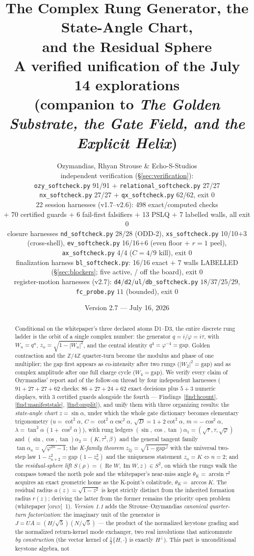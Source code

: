 \documentclass[11pt]{article}
\title{\bfseries The Complex Rung Generator, the State-Angle Chart,\\
and the Residual Sphere\\[4pt]
\large A verified unification of the July 14 explorations\\
(companion to \emph{The Golden Substrate, the Gate Field, and the Explicit Helix})}
\author{Ozymandias, Rhyan Strouse \& Echo-S-Studios\\[2pt]
\small independent verification (\S\ref{sec:verification}):\\
\small \texttt{ozy\_softcheck.py} 91/91 $+$ \texttt{relational\_softcheck.py} 27/27\\
\small \texttt{nx\_softcheck.py} 27/27 $+$ \texttt{qx\_softcheck.py} 62/62, exit 0\\
\small 22 session harnesses (v1.7--v2.6): 498 exact/computed checks\\
\small $+$ 70 certified guards $+$ 6 fail-first falsifiers $+$ 13 PSLQ $+$ 7 labelled walls, all exit 0\\
\small closure harnesses \texttt{nd\_softcheck.py} 28/28 (ODD-2), \texttt{xs\_softcheck.py} 10/10$+$3 (cross-shell), \texttt{ev\_softcheck.py} 16/16$+$6 (even floor $+$ $r{=}1$ peel), \texttt{ax\_softcheck.py} 4/4 ($C{=}4/9$ kill), exit 0\\
\small finalization harness \texttt{bl\_softcheck.py}: 16/16 exact $+$ 7 walls LABELLED (\S\ref{sec:blockers}; five active, \hx{BL-G4}/\hx{BL-G7} off the board), exit 0\\
\small register-motion harnesses (v2.7): \texttt{d4}/\texttt{d2}/\texttt{ul}/\texttt{db\_softcheck.py} $18$/$37$/$25$/$29$, \texttt{fc\_probe.py} $11$ (bounded), exit 0}
\date{Version 2.7 --- July 16, 2026}
\newcommand{\tagO}{\textcolor{cO}{\textsc{[open]}}}
\newcommand{\Z}{\mathbb{Z}}
\newcommand{\gp}{\varphi}
\newcommand{\gapc}{\mathrm{gap}}
\DeclareMathOperator{\Rea}{Re}
\DeclareMathOperator{\Ima}{Im}
\theoremstyle{plain}
\theoremstyle{definition}
\theoremstyle{remark}
\begin{document}
\maketitle

\begin{abstract}
\noindent
Conditional on the whitepaper's three declared atoms D1--D3, the entire discrete
rung ladder is the orbit of a single complex number: the generator
$q=i/\gp=i\tau$, with $W_n=q^n$, $z_n=\sqrt{1-|W_n|^2}$, and the central identity
$q^4=\gp^{-4}=\gapc$. Golden contraction and the $\Z/4\Z$ quarter-turn become the
modulus and phase of one multiplier; the gap first appears as co-intensity after
two rungs ($|W_2|^2=\gapc$) and as complex amplitude after one full charge cycle
($W_4=\gapc$). We verify every claim of Ozymandias' report and of the follow-on
thread by four independent harnesses ($91+27+27+62$ checks: $86{+}27{+}24{+}62$
exact decisions plus $5{+}3$ numeric displays, with $3$ certified guards
alongside the fourth --- Findings~\ref{find:hcount}, \ref{find:manifeststale},
\ref{find:ozsplit}), and unify them with three
organizing results: the \emph{state-angle chart} $z=\sin\alpha$, under which the
whole gate dictionary becomes elementary trigonometry ($u=\cot^2\alpha$,
$C=\cot^2\alpha\csc^2\alpha$, $\sqrt D=1+2\cot^2\alpha$, $m=-\cos^2\alpha$,
$\lambda=\tan^2\alpha\,(1+\cos^2\alpha)$), with rung ledgers
$(\sin,\cos,\tan)\alpha_1=(\sqrt\tau,\tau,\sqrt\gp)$ and
$(\sin,\cos,\tan)\alpha_2=(K,\tau^2,\beta)$ and the general tangent family
$\tan\alpha_n=\sqrt{\gp^{2n}-1}$; the \emph{K-family theorem}
$z_{2j}=\sqrt{1-\gapc^{\,j}}$ with the universal two-step law
$1-z_{n+2}^2=\gapc\,(1-z_n^2)$ and the uniqueness statement $z_n=K\iff n=2$; and
the \emph{residual-sphere lift} $S(\rho)=(\Rea W,\Ima W,z)\in S^2$, on which the
rungs walk the compass toward the north pole and the whitepaper's near-miss angle
$\theta_K=\arcsin\tau^2$ acquires an exact geometric home as the K-point's
colatitude, $\theta_K=\arccos K$. The residual radius $a(z)=\sqrt{1-z^2}$ is kept
strictly distinct from the inherited formation radius $r(z)$; deriving the latter
from the former remains the priority open problem (whitepaper \tagO{}~1). \emph{Version 1.1}
adds the Strouse--Ozymandias \emph{canonical quarter-turn factorization}: the
imaginary unit of the generator is
$J=UA=(H/\sqrt5)(N/\sqrt5)$ --- the product of the normalized keystone grading
and the normalized return-kernel mode exchanger, two real involutions that
anticommute \emph{by construction} (the vector kernel of $\tfrac12\{H,\cdot\}$
is exactly $H^\perp$). This part is unconditional keystone algebra, not

\end{abstract}
\end{document}
